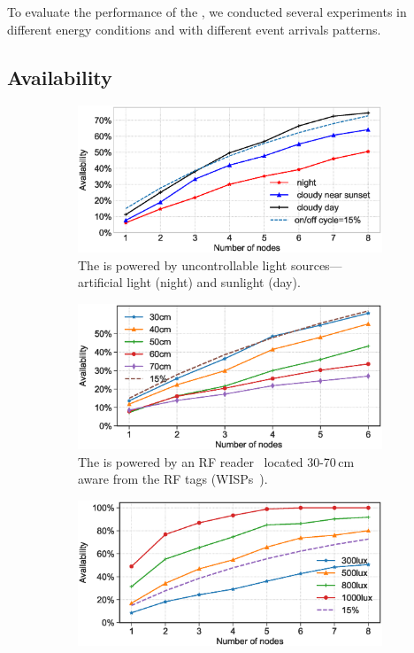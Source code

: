 To evaluate the performance of the \fullsys, we conducted several experiments in different energy conditions and with different event arrivals patterns. 
%
\subsection{Availability}
\begin{figure}[t]
        \begin{subfigure}{.66\columnwidth}
            \includegraphics[width=\textwidth]{figures/sysAvailability}
                \caption{The \sys is powered by uncontrollable light sources---artificial light (night) and sunlight (day).}
            \label{fig:solarPwrCIS}
        \end{subfigure}\hfill
        \begin{subfigure}{.66\columnwidth}
            \includegraphics[width=\textwidth]{figures/rf_sysAvailability}
                \caption{The \sys is powered by an RF reader~\cite{r420_website} located 30-70\,cm aware from the RF tags (WISPs~\cite{smith_ubicomp_2006}).}
            \label{fig:rfPwrCIS}
        \end{subfigure}\hfill
        \begin{subfigure}{.66\columnwidth}
            \includegraphics[width=\textwidth]{figures/sysAvailability_artificial-light}

\end{subfigure}
\end{figure}

